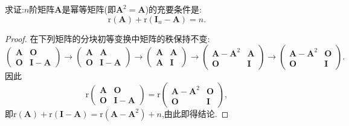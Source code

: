 \documentclass[lang=cn,newtx,10pt,scheme=chinese]{elegantbook}
\begin{document}
\begin{proposition}[幂等矩阵关于秩的判定准则]\label{proposition:幂等矩阵关于秩的判定准则}
求证:\(n\)阶矩阵\(\boldsymbol{A}\)是幂等矩阵(即\(\boldsymbol{A}^2 = \boldsymbol{A}\))的充要条件是:
\[
\mathrm{r}(\boldsymbol{A})+\mathrm{r}(\boldsymbol{I}_n - \boldsymbol{A}) = n.
\]
\end{proposition}
\begin{proof}
    在下列矩阵的分块初等变换中矩阵的秩保持不变:
    \[
    \begin{pmatrix}
    \boldsymbol{A}&\boldsymbol{O}\\
    \boldsymbol{O}&\boldsymbol{I}-\boldsymbol{A}
    \end{pmatrix}\to
    \begin{pmatrix}
    \boldsymbol{A}&\boldsymbol{A}\\
    \boldsymbol{O}&\boldsymbol{I}-\boldsymbol{A}
    \end{pmatrix}\to
    \begin{pmatrix}
    \boldsymbol{A}&\boldsymbol{A}\\
    \boldsymbol{A}&\boldsymbol{I}
    \end{pmatrix}\to
    \begin{pmatrix}
    \boldsymbol{A}-\boldsymbol{A}^2&\boldsymbol{A}\\
    \boldsymbol{O}&\boldsymbol{I}
    \end{pmatrix}\to
    \begin{pmatrix}
    \boldsymbol{A}-\boldsymbol{A}^2&\boldsymbol{O}\\
    \boldsymbol{O}&\boldsymbol{I}
    \end{pmatrix}.
    \]
    因此
    \[
    \mathrm{r}\begin{pmatrix}
    \boldsymbol{A}&\boldsymbol{O}\\
    \boldsymbol{O}&\boldsymbol{I}-\boldsymbol{A}
    \end{pmatrix}=\mathrm{r}\begin{pmatrix}
    \boldsymbol{A}-\boldsymbol{A}^2&\boldsymbol{O}\\
    \boldsymbol{O}&\boldsymbol{I}
    \end{pmatrix},
    \]
    即\(\mathrm{r}(\boldsymbol{A})+\mathrm{r}(\boldsymbol{I}-\boldsymbol{A})=\mathrm{r}(\boldsymbol{A}-\boldsymbol{A}^2)+n\),由此即得结论.  
\end{proof}
\end{document}
